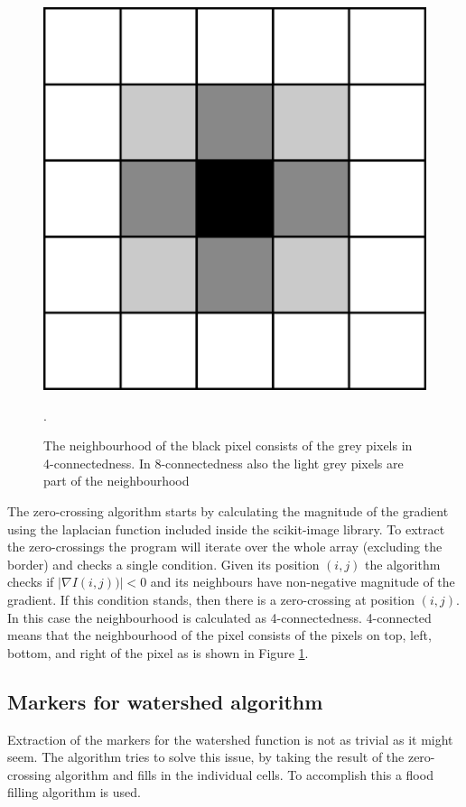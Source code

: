 \documentclass[
  digital,     %
  oneside,     %
  nosansbold,  %
  nocolorbold, %
  lof,         %
  lot,         %
]{fithesis4}
\begin{document}
\begin{figure}
    \begin{center}
        \includegraphics[width=0.3\linewidth]{resources/neighbourhood.png}
    \end{center}
    \caption{The neighbourhood of the black pixel consists of the grey pixels in
    4-connectedness. In 8-connectedness also the light grey pixels are part of the
    neighbourhood}.
    \label{fig:neighbourhood}
\end{figure}

The zero-crossing algorithm starts by calculating the magnitude of the gradient
using the laplacian function included inside the scikit-image library. To
extract the zero-crossings the program will iterate over the whole array
(excluding the border) and checks a single condition. Given its position $(i, j)$
the algorithm checks if $|\nabla I(i, j))| < 0$ and its neighbours have
non-negative magnitude of the gradient.  If this condition stands, then there is
a zero-crossing at position $(i, j)$. In this case the neighbourhood is
calculated as 4-connectedness. 4-connected means that the neighbourhood of the
pixel consists of the pixels on top, left, bottom, and right of the pixel as is
shown in Figure \ref{fig:neighbourhood}.

\subsection{Markers for watershed algorithm}
\label{sec-markers}
Extraction of the markers for the watershed function is not as trivial as it
might seem. The algorithm tries to solve this issue, by taking the result of the
zero-crossing algorithm and fills in the individual cells. To accomplish this
a flood filling algorithm is used.
\end{document}
